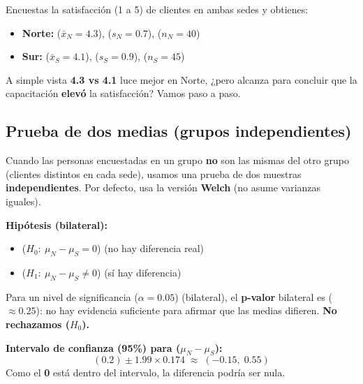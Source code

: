\documentclass[
  spanish,
  letterpaper,
  DIV=11,
  numbers=noendperiod]{scrreprt}
\providecommand{\tightlist}{%
  \setlength{\itemsep}{0pt}\setlength{\parskip}{0pt}}
\begin{document}
Encuestas la satisfacción (1 a 5) de clientes en ambas sedes y obtienes:

\begin{itemize}
\tightlist
\item
  \textbf{Norte:} (\(\bar{x}_N = 4.3\)), (\(s_N = 0.7\)),
  (\(n_N = 40\))\\
\item
  \textbf{Sur:} (\(\bar{x}_S = 4.1\)), (\(s_S = 0.9\)), (\(n_S = 45\))
\end{itemize}

A simple vista \textbf{4.3 vs 4.1} luce mejor en Norte, ¿pero alcanza
para concluir que la capacitación \textbf{elevó} la satisfacción? Vamos
paso a paso.

\subsection{Prueba de dos medias (grupos
independientes)}\label{prueba-de-dos-medias-grupos-independientes}

Cuando las personas encuestadas en un grupo \textbf{no} son las mismas
del otro grupo (clientes distintos en cada sede), usamos una prueba de
dos muestras \textbf{independientes}. Por defecto, usa la versión
\textbf{Welch} (no asume varianzas iguales).

\textbf{Hipótesis (bilateral):}

\begin{itemize}
\item
  (\(H_0:\ \mu_N - \mu_S = 0\)) (no hay diferencia real)
\item
  (\(H_1:\ \mu_N - \mu_S \neq 0\)) (sí hay diferencia)
\end{itemize}

Para un nivel de significancia (\(\alpha=0.05\)) (bilateral), el
\textbf{p-valor} bilateral es (\(\approx 0.25\)): no hay evidencia
suficiente para afirmar que las medias difieren. \textbf{No rechazamos
(\(H_0\)).}

\textbf{Intervalo de confianza (95\%) para (\(\mu_N - \mu_S\)):} \[
(0.2) \pm 1.99 \times 0.174 \;\approx\; (-0.15,\; 0.55)
\] Como el \textbf{0} está dentro del intervalo, la diferencia podría
ser nula.
\end{document}

